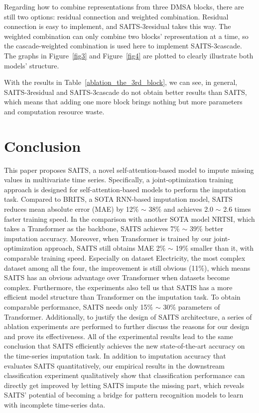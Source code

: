 \documentclass{article}
\begin{document}
Regarding how to combine representations from three DMSA blocks, there are still two options: residual connection and weighted combination. Residual connection is easy to implement, and SAITS-3residual takes this way. The weighted combination can only combine two blocks' representation at a time, so the cascade-weighted combination is used here to implement SAITS-3cascade. The graphs in Figure~\ref{fig3} and Figure~\ref{fig4} are plotted to clearly illustrate both models' structure.

With the results in Table~\ref{ablation_the_3rd_block}, we can see, in general, SAITS-3residual and SAITS-3cascade do not obtain better results than SAITS, which means that adding one more block brings nothing but more parameters and computation resource waste.

\section{Conclusion} \label{conclusion}
This paper proposes SAITS, a novel self-attention-based model to impute missing values in multivariate time series. Specifically, a joint-optimization training approach is designed for self-attention-based models to perform the imputation task. Compared to BRITS, a SOTA RNN-based imputation model, SAITS reduces mean absolute error (MAE) by 12\% $\sim$ 38\% and achieves 2.0 $\sim$ 2.6 times faster training speed. In the comparison with another SOTA model NRTSI, which takes a Transformer as the backbone, SAITS achieves 7\% $\sim$ 39\% better imputation accuracy. Moreover, when Transformer is trained by our joint-optimization approach, SAITS still obtains MAE 2\% $\sim$ 19\% smaller than it, with comparable training speed. Especially on dataset Electricity, the most complex dataset among all the four, the improvement is still obvious (11\%), which means SAITS has an obvious advantage over Transformer when datasets become complex. Furthermore, the experiments also tell us that SATIS has a more efficient model structure than Transformer on the imputation task. To obtain comparable performance, SAITS needs only 15\% $\sim$ 30\% parameters of Transformer. Additionally, to justify the design of SAITS architecture, a series of ablation experiments are performed to further discuss the reasons for our design and prove its effectiveness. All of the experimental results lead to the same conclusion that SAITS efficiently achieves the new state-of-the-art accuracy on the time-series imputation task. In addition to imputation accuracy that evaluates SAITS quantitatively, our empirical results in the downstream classification experiment qualitatively show that classification performance can directly get improved by letting SAITS impute the missing part, which reveals SAITS' potential of becoming a bridge for pattern recognition models to learn with incomplete time-series data.
\end{document}
